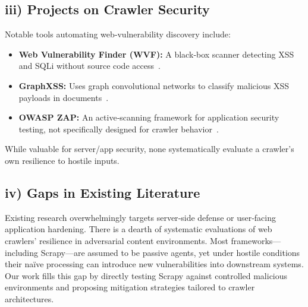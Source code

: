 \subsection*{iii) Projects on Crawler Security}
Notable tools automating web‐vulnerability discovery include:

\begin{itemize}[topsep=4pt,itemsep=2pt]
  \item \textbf{Web Vulnerability Finder (WVF):} A black‐box scanner detecting XSS and SQLi without source code access~\cite{wvf}.
  \item \textbf{GraphXSS:} Uses graph convolutional networks to classify malicious XSS payloads in documents~\cite{graphxss}.
  \item \textbf{OWASP ZAP:} An active‐scanning framework for application security testing, not specifically designed for crawler behavior~\cite{owasp2023zap}.
\end{itemize}

While valuable for server/app security, none systematically evaluate a crawler’s own resilience to hostile inputs.

\subsection*{iv) Gaps in Existing Literature}
Existing research overwhelmingly targets server‐side defense or user‐facing application hardening. There is a dearth of systematic evaluations of web crawlers’ resilience in adversarial content environments. Most frameworks—including Scrapy—are assumed to be passive agents, yet under hostile conditions their naïve processing can introduce new vulnerabilities into downstream systems. Our work fills this gap by directly testing Scrapy against controlled malicious environments and proposing mitigation strategies tailored to crawler architectures.

